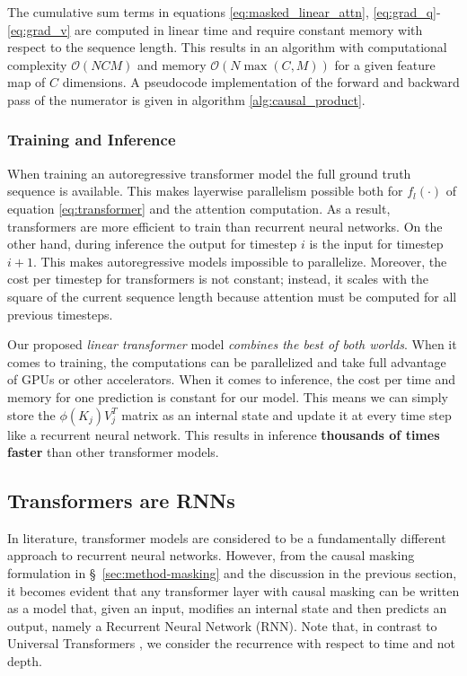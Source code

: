 The cumulative sum terms in equations \ref{eq:masked_linear_attn},
\ref{eq:grad_q}-\ref{eq:grad_v} are computed in linear time and require constant memory with respect to the sequence length. This results in an algorithm with computational complexity $\mathcal{O}\left(N C M\right)$ and memory $\mathcal{O}\left(N
\max\left(C, M\right)\right)$ for a given feature map of $C$ dimensions. A pseudocode implementation of the forward and backward pass of the numerator is given in algorithm \ref{alg:causal_product}.

\subsubsection{Training and Inference}

When training an autoregressive transformer model the full ground truth sequence is available. This makes layerwise parallelism possible both for
$f_l(\cdot)$ of equation \ref{eq:transformer} and the attention computation. As a result, transformers are more efficient to train than recurrent neural networks. On the other hand, during inference the output for timestep $i$ is the input for timestep $i+1$. This makes autoregressive models impossible to parallelize. Moreover, the cost per timestep for transformers is not constant; instead, it scales with the square of the current sequence length because attention must be computed for all previous timesteps.

Our proposed \emph{linear transformer} model \emph{combines the best of both worlds}. When it comes to training, the computations can be parallelized and take full advantage of GPUs or other accelerators. When it comes to inference, the cost per time and memory for one prediction is constant for our model. This means we can simply store the $\phi\left(K_j\right)V_j^T$ matrix as an internal state and update it at every time step like a recurrent neural network. This results in inference
\textbf{thousands of times faster} than other transformer models.

\subsection{Transformers are RNNs} \label{sec:method-trnn}

In literature, transformer models are considered to be a fundamentally different approach to recurrent neural networks. However, from the causal masking formulation in \S~\ref{sec:method-masking} and the discussion in the previous section, it becomes evident that any transformer layer with causal masking can be written as a model that, given an input, modifies an internal state and then predicts an output, namely a Recurrent Neural Network (RNN). Note that, in contrast to Universal Transformers \cite{dehghani2018universal}, we consider the recurrence with respect to time and not depth.

